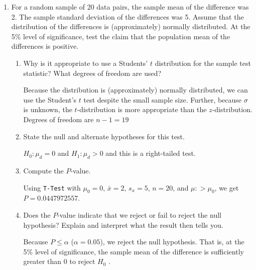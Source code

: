 \begin{enumerate}

\item For a random sample of 20 data pairs, the sample mean of the difference was 2. The sample standard deviation of the differences was 5. Assume that the distribution of the differences is (approximately) normally distributed. At the 5\% level of significance, test the claim that the population mean of the differences is positive.
	\begin{enumerate}
	\item Why is it appropriate to use a Students' $t$ distribution for the sample test statistic?   What degrees of freedom are used? 
	
	{\answer Because the distribution is (approximately) normally distributed, we can use the Student's $t$ test despite the small sample size. Further, because $\sigma$ is unknown, the $t$-distribution is more appropriate than the $z$-distribution.  
	Degrees of freedom are $n-1 = 19$} 
	 
	\vfill
	
	\item State the null and alternate hypotheses for this test.  
	
	{\answer $H_0 : \mu_d = 0$  and $H_1: \mu_d > 0$ and this is a right-tailed test.} 
	 
	\vfill
	
	\item Compute the $P$-value.  
	
	{\answer Using \texttt{T-Test} with $\mu_0 = 0$, $\bar{x} = 2$, $s_x = 5$, $n = 20 $, and $\mu: > \mu_0$, we get $P = 0.0447972557$.} 
	 
	\vfill
	
	\item Does the $P$-value indicate that we reject or fail to reject the null hypothesis? Explain and interpret what the result then tells you.  
	
	{\answer Because $P\leq \alpha$ ($\alpha= 0.05$), we reject the null hypothesis. That is, at the 5\% level of significance, the sample mean of the difference is sufficiently greater than $0$ to reject $H_0$ .}
	
	\vfill
	\end{enumerate}
	
\newpage


\end{enumerate}
